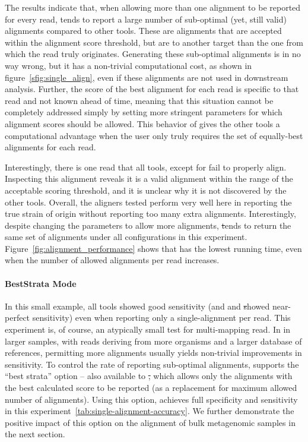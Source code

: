 The results indicate that, when allowing more than one alignment to be reported for every read, \bt
tends to report a large number of sub-optimal (yet, still valid) alignments compared to other tools. 
These are alignments that are accepted within the alignment score threshold, but are to another target 
than the one from which the read truly originates. Generating these sub-optimal alignments is in no way 
wrong, but it has a non-trivial computational cost, as shown in figure~\ref{sfig:single_align}, even if 
these alignments are not used in downstream analysis. Further, the score of the best alignment for each 
read is specific to that read and not known ahead of time, meaning that this situation cannot be completely 
addressed simply by setting more stringent parameters for which alignment scores should be allowed. 
This behavior of \bt gives the other tools a computational advantage when the user only truly requires 
the set of equally-best alignments for each read.
    
Interestingly, there is one read that all tools, except for \puffaligner fail to properly align.
Inspecting this alignment reveals it is a valid alignment within the range of the acceptable scoring 
threshold, and it is unclear why it is not discovered by the other tools. Overall, the aligners tested 
perform very well here in reporting the true strain of origin without reporting too many extra alignments. 
Interestingly, despite changing the parameters to allow more alignments, \st tends to return the same set 
of alignments under all configurations in this experiment.  Figure~\ref{fig:alignment_performance} shows 
that \puffaligner has the lowest running time, even when the number of allowed alignments per read increases.

\paragraph{BestStrata Mode}

In this small example, all tools showed good sensitivity (and 
\puffaligner and \st showed near-perfect sensitivity) even when reporting
only a single-alignment per read. This experiment is, of course, an
atypically small test for multi-mapping read. In in larger samples, with
reads deriving from more organisms and a larger database of references,
permitting more alignments usually yields non-trivial improvements in
sensitivity. To control the rate of reporting sub-optimal alignments,
\puffaligner supports the ``best strata'' option -- also available to
\st, which allows only the alignments with the best calculated score to
be reported (as a replacement for maximum allowed number of alignments).
Using this option, \puffaligner achieves full specificity and sensitivity
in this experiment~\cref{tab:single-alignment-accuracy}.
We further demonstrate the positive impact of this option on the
alignment of bulk metagenomic samples in the next section.

